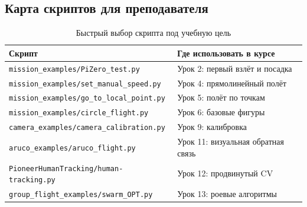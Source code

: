 \subsection{Карта скриптов для преподавателя}
\begin{table}[H]
\centering
\begin{tabularx}{\textwidth}{>{\raggedright\arraybackslash}p{}>{\raggedright\arraybackslash}X}
\toprule
Скрипт & Где использовать в курсе \\
\midrule
\texttt{mission\_examples/PiZero\_test.py} & Урок 2: первый взлёт и посадка \\
\texttt{mission\_examples/set\_manual\_speed.py} & Урок 4: прямолинейный полёт \\
\texttt{mission\_examples/go\_to\_local\_point.py} & Урок 5: полёт по точкам \\
\texttt{mission\_examples/circle\_flight.py} & Урок 6: базовые фигуры \\
\texttt{camera\_examples/camera\_calibration.py} & Урок 9: калибровка \\
\texttt{aruco\_examples/aruco\_flight.py} & Урок 11: визуальная обратная связь \\
\texttt{PioneerHumanTracking/human-tracking.py} & Урок 12: продвинутый CV \\
\texttt{group\_flight\_examples/swarm\_OPT.py} & Урок 13: роевые алгоритмы \\
\bottomrule
\end{tabularx}
\caption{Быстрый выбор скрипта под учебную цель}
\end{table}

\nocite{opencv_calibration}
\nocite{mediapipe_pose}
\nocite{python_threading}
